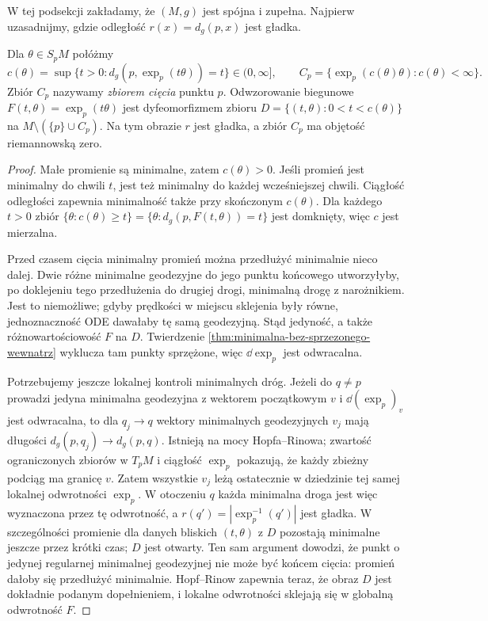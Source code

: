 W tej podsekcji zakładamy, że $(M,g)$ jest spójna
i zupełna. Najpierw uzasadnijmy, gdzie odległość
$r(x)=d_g(p,x)$ jest gładka.

\begin{lemat}
\label{lem:czas-ciecia-polar}
Dla $\theta\in S_pM$ połóżmy
\[
 c(\theta)=\sup\{t>0:d_g(p,\exp_p(t\theta))=t\}
 \in(0,\infty],\qquad
 C_p=\{\exp_p(c(\theta)\theta):c(\theta)<\infty\}.
\]
Zbiór $C_p$ nazywamy \emph{zbiorem cięcia} punktu $p$.
Odwzorowanie biegunowe $F(t,\theta)=\exp_p(t\theta)$
jest dyfeomorfizmem zbioru
$D=\{(t,\theta):0<t<c(\theta)\}$ na
$M\setminus(\{p\}\cup C_p)$. Na tym obrazie $r$ jest
gładka, a zbiór $C_p$ ma objętość riemannowską zero.
\end{lemat}
\begin{proof}
Małe promienie są minimalne, zatem $c(\theta)>0$.
Jeśli promień jest minimalny do chwili $t$, jest też
minimalny do każdej wcześniejszej chwili. Ciągłość
odległości zapewnia minimalność także przy skończonym
$c(\theta)$. Dla każdego $t>0$ zbiór
$\{\theta:c(\theta)\geq t\}
=\{\theta:d_g(p,F(t,\theta))=t\}$ jest domknięty,
więc $c$ jest mierzalna.

Przed czasem cięcia minimalny promień można przedłużyć
minimalnie nieco dalej. Dwie różne minimalne geodezyjne
do jego punktu końcowego utworzyłyby, po doklejeniu
tego przedłużenia do drugiej drogi, minimalną drogę
z narożnikiem. Jest to niemożliwe; gdyby prędkości
w miejscu sklejenia były równe, jednoznaczność ODE
dawałaby tę samą geodezyjną. Stąd jedyność, a także
różnowartościowość $F$ na $D$. Twierdzenie
\ref{thm:minimalna-bez-sprzezonego-wewnatrz} wyklucza
tam punkty sprzężone, więc $\dd\exp_p$ jest odwracalna.

Potrzebujemy jeszcze lokalnej kontroli minimalnych dróg.
Jeżeli do $q\ne p$ prowadzi jedyna minimalna geodezyjna
z wektorem początkowym $v$ i $\dd(\exp_p)_v$ jest
odwracalna, to dla $q_j\to q$ wektory minimalnych
geodezyjnych $v_j$ mają długości $d_g(p,q_j)\to d_g(p,q)$.
Istnieją na mocy Hopfa--Rinowa; zwartość ograniczonych
zbiorów w $T_pM$ i ciągłość $\exp_p$ pokazują, że każdy
zbieżny podciąg ma granicę $v$. Zatem wszystkie $v_j$
leżą ostatecznie w dziedzinie tej samej lokalnej
odwrotności $\exp_p$. W otoczeniu $q$ każda minimalna
droga jest więc wyznaczona przez tę odwrotność,
a $r(q')=|\exp_p^{-1}(q')|$ jest gładka.
W szczególności promienie dla danych bliskich $(t,\theta)$
z $D$ pozostają minimalne jeszcze przez krótki czas;
$D$ jest otwarty. Ten sam argument dowodzi, że punkt
o jedynej regularnej minimalnej geodezyjnej nie może
być końcem cięcia: promień dałoby się przedłużyć minimalnie.
Hopf--Rinow zapewnia teraz, że obraz $D$ jest dokładnie
podanym dopełnieniem, i lokalne odwrotności sklejają
się w globalną odwrotność $F$.


\end{proof}
